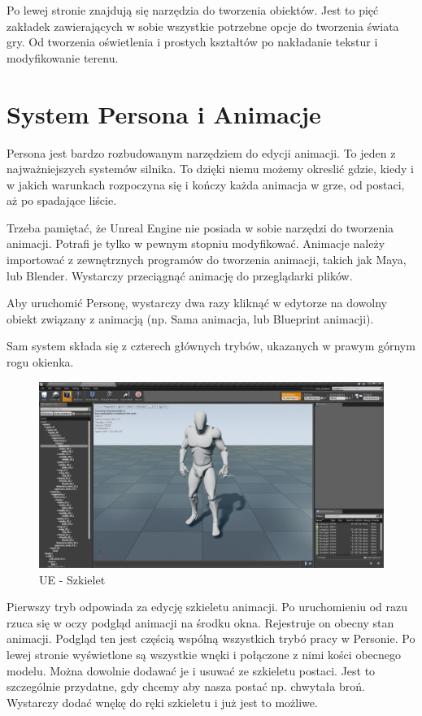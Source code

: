 \documentclass[brudnopis]{xmgr}
\begin{document}
Po lewej stronie znajdują się narzędzia do tworzenia obiektów. Jest to pięć zakładek zawierających w sobie wszystkie potrzebne opcje do tworzenia świata gry. Od tworzenia oświetlenia i prostych kształtów po nakładanie tekstur i modyfikowanie terenu.
 
\section{System Persona i Animacje}
Persona jest bardzo rozbudowanym narzędziem do edycji animacji. To jeden z najważniejszych systemów silnika. To dzięki niemu możemy okreslić gdzie, kiedy i w jakich warunkach  rozpoczyna się i kończy każda animacja w grze, od postaci, aż po spadające liście.

Trzeba pamiętać, że Unreal Engine nie posiada w sobie narzędzi do tworzenia animacji. Potrafi je tylko w pewnym stopniu modyfikować. Animacje należy importować z zewnętrznych programów do tworzenia animacji, takich jak Maya, lub Blender. Wystarczy przeciągnąć animację do przeglądarki plików.

Aby uruchomić Personę, wystarczy dwa razy kliknąć w edytorze na dowolny obiekt związany z animacją (np. Sama animacja, lub Blueprint animacji).

Sam system składa się z czterech głównych trybów, ukazanych w prawym górnym rogu okienka.

\begin{figure}[!htb]
    \begin{center}
    \includegraphics[scale=0.25]{Screeny/Skeleton}
    \end{center}
    \caption{UE - Szkielet}
\end{figure}

Pierwszy tryb odpowiada za edycję szkieletu animacji. Po uruchomieniu od razu rzuca się w oczy podgląd animacji na środku okna. Rejestruje on obecny stan animacji. Podgląd ten jest częścią wspólną wszystkich trybó pracy w Personie.
Po lewej stronie wyświetlone są wszystkie wnęki i połączone z nimi kości obecnego modelu. Można dowolnie dodawać je i usuwać ze szkieletu postaci. Jest to szczególnie przydatne, gdy chcemy aby nasza postać np. chwytała broń. Wystarczy dodać wnękę do ręki szkieletu i już jest to możliwe.
\end{document}
